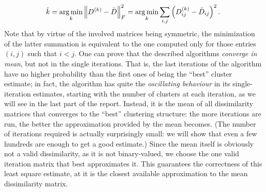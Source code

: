 $$
\hat{k} = \operatorname*{arg\,min}_k \left\lVert D^{(k)} - \bar D \right\rVert_F^2 = \operatorname*{arg\,min}_k \sum_{i,j} \left( D^{(k)}_{ij} - \bar{D}_{ij} \right)^2.
$$
Note that by virtue of the involved matrices being symmetric, the minimization of the latter summation is equivalent to the one computed only for those entries $(i,j)$ such that $i<j$.
One can prove that the described algorithms \emph{converge in mean}, but not in the single iterations.
That is, the last iterations of the algorithm have no higher probability than the first ones of being the ``best'' cluster estimate; in fact, the algorithm has quite the \emph{oscillating behaviour} in its single-iteration estimates, starting with the number of clusters at each iteration, as we will see in the last part of the report.
Instead, it is the mean of all dissimilarity matrices that converges to the ``best'' clustering structure: the more iterations are run, the better the approximation provided by the mean becomes.
(The number of iterations required is actually surprisingly small: we will show that even a few hundreds are enough to get a good estimate.)
Since the mean itself is obviously not a valid dissimilarity, as it is not binary-valued, we choose the one valid iteration matrix that best approximates it.
This guarantees the correctness of this least square estimate, at it is the closest available approximation to the mean dissimilarity matrix.



